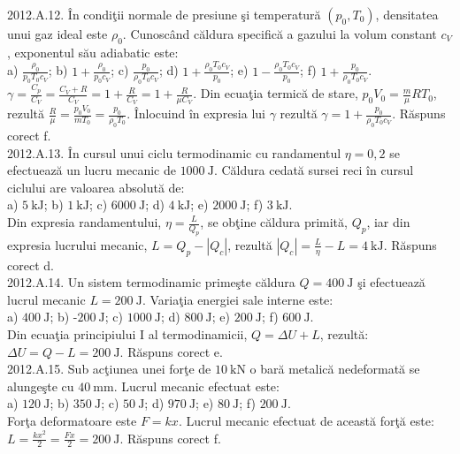 2012.A.12. În condiţii normale de presiune şi temperatură $\left(p_{0}, T_{0}\right)$, densitatea unui gaz ideal este $\rho_{0}$. Cunoscând căldura specifică a gazului la volum constant $c_{V}$, exponentul său adiabatic este:\\ a) $\frac{\rho_{0}}{p_{0} T_{0} c_{V}}$; b) $1+\frac{\rho_{0}}{p_{0} c_{V}}$; c) $\frac{p_{0}}{\rho_{0} T_{0} c_{V}}$; d) $1+\frac{\rho_{0} T_{0} c_{V}}{p_{0}}$; e) $1-\frac{\rho_{0} T_{0} c_{V}}{p_{0}}$; f) $1+\frac{p_{0}}{\rho_{0} T_{0} c_{V}}$.\\ $\gamma=\frac{C_{p}}{C_{V}}=\frac{C_{V}+R}{C_{V}}=1+\frac{R}{C_{V}}=1+\frac{R}{\mu C_{V}}$. Din ecuaţia termică de stare, $p_{0} V_{0}=\frac{m}{\mu} R T_{0}$, rezultă $\frac{R}{\mu}=\frac{p_{0} V_{0}}{m T_{0}}=\frac{p_{0}}{\rho_{0} T_{0}}$. Înlocuind în expresia lui $\gamma$ rezultă $\gamma=1+\frac{p_{0}}{\rho_{0} T_{0} c_{V}}$. Răspuns corect f.\\

2012.A.13. În cursul unui ciclu termodinamic cu randamentul $\eta=0,2$ se efectuează un lucru mecanic de $1000 \mathrm{~J}$. Căldura cedată sursei reci în cursul ciclului are valoarea absolută de:\\ a) $5 \mathrm{~kJ}$; b) $1 \mathrm{~kJ}$; c) $6000 \mathrm{~J}$; d) $4 \mathrm{~kJ}$; e) $2000 \mathrm{~J}$; f) $3 \mathrm{~kJ}$.\\ Din expresia randamentului, $\eta=\frac{L}{Q_{p}}$, se obţine căldura primită, $Q_{p}$, iar din expresia lucrului mecanic, $L=Q_{p}-\left|Q_{c}\right|$, rezultă $\left|Q_{c}\right|=\frac{L}{\eta}-L=4 \mathrm{~kJ}$. Răspuns corect d.\\

2012.A.14. Un sistem termodinamic primeşte căldura $Q=400 \mathrm{~J}$ şi efectuează lucrul mecanic $L=200 \mathrm{~J}$. Variaţia energiei sale interne este:\\ a) $400 \mathrm{~J}$; b) -$200 \mathrm{~J}$; c) $1000 \mathrm{~J}$; d) $800 \mathrm{~J}$; e) $200 \mathrm{~J}$; f) $600 \mathrm{~J}$.\\ Din ecuaţia principiului I al termodinamicii, $Q=\Delta U+L$, rezultă:\\ $\Delta U=Q-L=200 \mathrm{~J}$. Răspuns corect e.\\

2012.A.15. Sub acţiunea unei forţe de $10 \mathrm{~kN}$ o bară metalică nedeformată se alungeşte cu $40 \mathrm{~mm}$. Lucrul mecanic efectuat este:\\ a) $120 \mathrm{~J}$; b) $350 \mathrm{~J}$; c) $50 \mathrm{~J}$; d) $970 \mathrm{~J}$; e) $80 \mathrm{~J}$; f) $200 \mathrm{~J}$.\\ Forţa deformatoare este $F=k x$. Lucrul mecanic efectuat de această forţă este:\\ $L=\frac{k x^{2}}{2}=\frac{F x}{2}=200 \mathrm{~J}$. Răspuns corect f.\\

